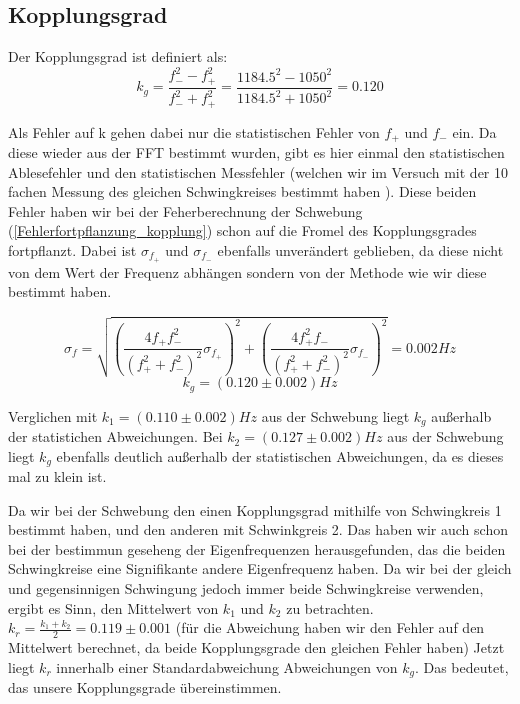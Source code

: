 \documentclass[twoside]{protokoll}
\begin{document}
\subsection{Kopplungsgrad}
Der Kopplungsgrad ist definiert als:
\begin{equation}
    k_g = \frac{f_-^2-f_+^2}{f_-^2+f_+^2} = \frac{1184.5^2-1050^2}{1184.5^2+1050^2} = 0.120
\end{equation}

Als Fehler auf k gehen dabei nur die statistischen Fehler von $f_+$ und $f_-$ ein.
Da diese wieder aus der FFT bestimmt wurden, gibt es hier einmal den statistischen Ablesefehler und den statistischen Messfehler (welchen wir im Versuch mit der 10 fachen Messung des gleichen Schwingkreises bestimmt haben ).
Diese beiden Fehler haben wir bei der Feherberechnung der Schwebung (\ref{Fehlerfortpflanzung_kopplung}) schon auf die Fromel des Kopplungsgrades fortpflanzt.
Dabei ist $\sigma_{f_+}$ und $\sigma_{f_-}$ ebenfalls unverändert geblieben, da diese nicht von dem Wert der Frequenz abhängen sondern von der Methode wie wir diese bestimmt haben.
 
\begin{equation}
    \sigma_f =\sqrt{\left(\frac{4f_+f_-^2}{\left(f_+^2+f_-^2\right)^2}\sigma_{f_+}\right)^2 + \left(\frac{4f_+^2f_-}{\left(f_+^2+f_-^2\right)^2}\sigma_{f_-}\right)^2}
    = 0.002 Hz
\end{equation}
\begin{equation}
    k_g = (0.120 \pm 0.002) Hz
\end{equation}

Verglichen mit $k_1 = (0.110 \pm 0.002) Hz$ aus der Schwebung liegt $k_g$ außerhalb der statistichen Abweichungen.
Bei $k_2 = (0.127 \pm 0.002) Hz$ aus der Schwebung liegt $k_g$ ebenfalls deutlich außerhalb der statistischen Abweichungen, da es dieses mal zu klein ist.
 
Da wir bei der Schwebung den einen Kopplungsgrad mithilfe von Schwingkreis 1 bestimmt haben, und  den anderen mit Schwinkgreis 2.
Das haben wir auch schon bei der bestimmun geseheng der Eigenfrequenzen herausgefunden, das die beiden Schwingkreise eine Signifikante andere Eigenfrequenz haben.
Da wir bei der gleich und gegensinnigen Schwingung jedoch immer beide Schwingkreise verwenden, ergibt es Sinn, den Mittelwert von $k_1$ und $k_2$ zu betrachten.
$k_r = \frac{k_1 + k_2}{2} = 0.119 \pm 0.001$ 
(für die Abweichung haben wir den Fehler auf den Mittelwert berechnet, da beide Kopplungsgrade den gleichen Fehler haben)
Jetzt liegt $k_r$ innerhalb einer Standardabweichung Abweichungen von $k_g$.
Das  bedeutet, das unsere Kopplungsgrade übereinstimmen.
\end{document}
